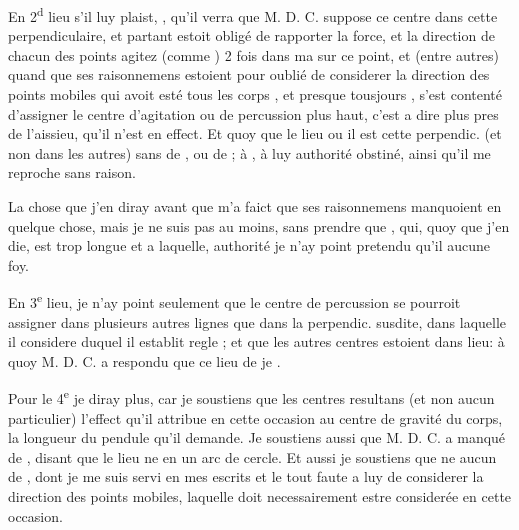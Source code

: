 \documentclass[11pt,a4paper]{article}
\begin{document}
En 2\textsuperscript{d} lieu \ill{} \ill{} s'il luy plaist,  \ill{} \ill{}, qu'il verra que M. D. C. suppose ce centre dans cette perpendiculaire, et partant estoit obligé de rapporter la force, et la direction de chacun des points agitez (comme \ill{} \ill{}) \ill{} \ill{} \ill{}   2 fois dans ma \ill{} sur ce point, et (entre autres) quand \ill{}  que ses raisonnemens estoient  pour  oublié de considerer la direction des points mobiles \ill{} qui avoit esté \ill{} \ill{} tous les corps , et presque tousjours \ill{}, s'est contenté d'assigner le centre d'agitation ou de percussion plus haut, c'est a dire plus pres de l'aissieu, qu'il n'est en effect. Et quoy que \ill{} \ill{} le lieu ou il est \ill{} cette perpendic. (et non dans les autres) sans \ill{} de , ou de \ill{};  \ill{} \ill{} à \ill{} \ill{}, \ill{} à luy \ill{} \ill{} authorité \ill{} obstiné, ainsi qu'il me reproche sans raison.

La  chose que j'en diray avant que \ill{} \ill{} m'a faict  que ses raisonnemens manquoient en quelque chose, mais je ne suis pas \ill{} \ill{} \ill{} \ill{} au moins, sans \struck{\ill{}} \ill{} prendre \ill{} que \ill{} \ill{}, qui, quoy que j'en die, est trop longue et a laquelle, \ill{} \ill{} authorité je n'ay point pretendu qu'il  aucune foy.

En 3\textsuperscript{e} lieu, je n'ay point \ill{}  seulement que le centre de percussion se pourroit assigner \ill{} dans plusieurs autres lignes que dans la perpendic. susdite, dans laquelle  il considere \ill{} \ill{} duquel il establit \ill{} regle \ill{}; et que les autres centres estoient dans \ill{} lieu: à quoy M. D. C. \ill{} \ill{} a respondu que ce lieu de \ill{} je \ill{} \ill{} \ill{}.

Pour le 4\textsuperscript{e} je diray plus, car je soustiens que les centres resultans (et non aucun particulier) \ill{} l'effect qu'il attribue en cette occasion au centre de gravité du corps, \ill{} la longueur du pendule qu'il demande. Je soustiens aussi que M. D. C. a manqué de \ill{}, disant que le lieu  ne \ill{} \ill{} en un arc de cercle. Et aussi je soustiens que \ill{} \ill{} ne  aucun \ill{} de \ill{} , dont je me suis servi en mes escrits et le tout faute a luy de considerer la direction des points mobiles, laquelle doit necessairement estre considerée en cette occasion.
\end{document}
